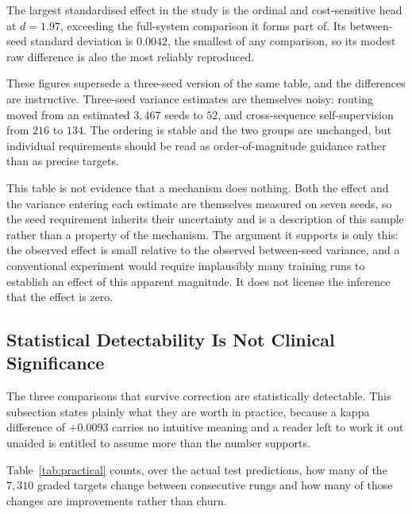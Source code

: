 \documentclass[12pt,a4paper]{report}
\begin{document}
The largest standardised effect in the study is the ordinal and cost-sensitive
head at $d = 1.97$, exceeding the full-system comparison it forms part of. Its
between-seed standard deviation is $0.0042$, the smallest of any comparison, so
its modest raw difference is also the most reliably reproduced.

These figures supersede a three-seed version of the same table, and the
differences are instructive. Three-seed variance estimates are themselves noisy:
routing moved from an estimated $3{,}467$ seeds to $52$, and cross-sequence
self-supervision from $216$ to $134$. The ordering is stable and the two groups
are unchanged, but individual requirements should be read as
order-of-magnitude guidance rather than as precise targets.

This table is not evidence that a mechanism does nothing. Both the effect and the
variance entering each estimate are themselves measured on seven seeds, so the
seed requirement inherits their uncertainty and is a description of this sample
rather than a property of the mechanism. The argument it supports is only this:
the observed effect is small relative to the observed between-seed variance, and
a conventional experiment would require implausibly many training runs to
establish an effect of this apparent magnitude. It does not license the
inference that the effect is zero.

\subsection{Statistical Detectability Is Not Clinical Significance}
\label{sec:results-practical}

The three comparisons that survive correction are statistically detectable. This
subsection states plainly what they are worth in practice, because a
kappa difference of $+0.0093$ carries no intuitive meaning and a reader left to
work it out unaided is entitled to assume more than the number supports.

Table~\ref{tab:practical} counts, over the actual test predictions, how many of
the $7{,}310$ graded targets change between consecutive rungs and how many of
those changes are improvements rather than churn.

\begin{table}[htbp]
  \centering
  \caption{Predictions changed between rungs on the frozen test partition,
  averaged over seven seeds. \enquote{Fixed} counts targets the upper rung grades
  correctly and the lower does not; \enquote{broken} counts the reverse. Counted
  from the saved predictions by \texttt{implementation/make\_figures.py}.}
  \label{tab:practical}
  
\end{table}
\end{document}
